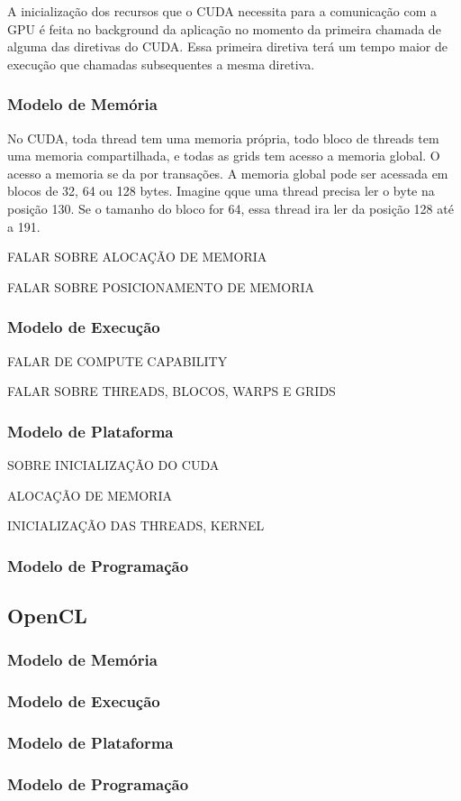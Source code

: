 A inicialização dos recursos que o CUDA necessita para a comunicação com a GPU é feita no background da
aplicação no momento da primeira chamada de alguma das diretivas do CUDA. Essa primeira diretiva terá um
tempo maior de execução que chamadas subsequentes a mesma diretiva.
\subsubsection{Modelo de Memória}
No CUDA, toda thread tem uma memoria própria, todo bloco de threads tem uma memoria compartilhada, e todas as grids tem
acesso a memoria global. O acesso a memoria se da por transações. A memoria global pode ser acessada em blocos de 32, 64 ou 128 bytes.
Imagine qque uma thread precisa ler o byte na posição 130. Se o tamanho do bloco for 64, essa thread ira ler da posição 128 até a 191.

FALAR SOBRE ALOCAÇÃO DE MEMORIA

FALAR SOBRE POSICIONAMENTO DE MEMORIA

\subsubsection{Modelo de Execução}
FALAR DE COMPUTE CAPABILITY

FALAR SOBRE THREADS, BLOCOS, WARPS E GRIDS
\subsubsection{Modelo de Plataforma}
SOBRE INICIALIZAÇÃO DO CUDA

ALOCAÇÃO DE MEMORIA

INICIALIZAÇÃO DAS THREADS, KERNEL
\subsubsection{Modelo de Programação}

\subsection{OpenCL}
\subsubsection{Modelo de Memória}
\subsubsection{Modelo de Execução}
\subsubsection{Modelo de Plataforma}
\subsubsection{Modelo de Programação}
